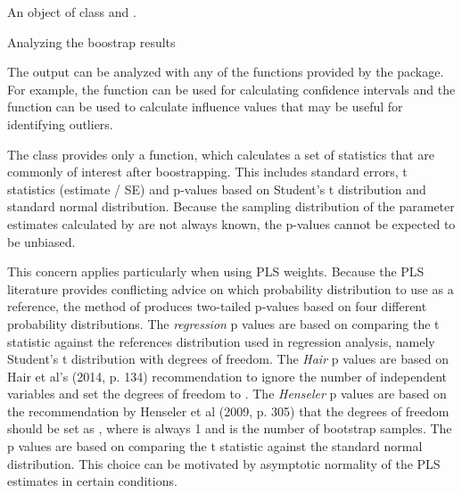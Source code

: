 \documentclass[a4paper]{book}
\begin{document}
%
\begin{Value}
An object of class  and .
\end{Value}
%
\begin{Section}{Analyzing the boostrap results}


The output can be analyzed with any of the functions provided by the  package.
For example, the  function can be used for calculating confidence 
intervals and the  function can be used to calculate influence values that may
be useful for identifying outliers.

The class  provides only a  function, which calculates a set
of statistics that are commonly of interest after boostrapping. This includes standard errors,
t statistics (estimate / SE) and p-values based on Student's t distribution and standard normal
distribution. Because the sampling distribution of the parameter estimates calculated by 
 are not always known, the p-values cannot be expected to be unbiased.

This concern
applies particularly when using PLS weights. Because the PLS literature provides conflicting
advice on which probability distribution to use as a reference, the  method of 
 produces two-tailed p-values based on four different probability
distributions. The \emph{regression} p values are based on comparing the t statistic against
the references distribution used in regression analysis, namely Student's t distribution with 
 degrees of freedom. The \emph{Hair} p values are based on 
Hair et al's (2014, p. 134) recommendation to ignore the number of independent variables 
 and set the degrees of freedom to . The \emph{Henseler} p values are based
on the recommendation by
Henseler et al (2009, p. 305) that the degrees of freedom should be set as ,
where is always 1 and  is the number of bootstrap samples. The  p values
are based on comparing the t statistic against the standard normal distribution. This choice
can be motivated by asymptotic normality of the PLS estimates in certain conditions.
\end{Section}
%
\end{document}
